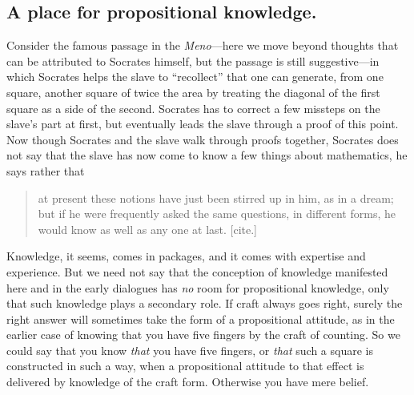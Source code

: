 \documentclass[11pt]{amsart}
\begin{document}
\subsection{A place for propositional knowledge.} Consider the famous passage in the \emph{Meno}---here we move beyond thoughts that can be attributed to Socrates himself, but the passage is still suggestive---in which Socrates helps the slave to ``recollect'' that one can generate, from one square, another square of twice the area by treating the diagonal of the first square as a side of the second. Socrates has to correct a few missteps on the slave's part at first, but eventually leads the slave through a proof of this point. Now though Socrates and the slave walk through proofs together, Socrates does not say that the slave has now come to know a few things about mathematics, he says rather that\begin{quote}at present these notions have just been stirred up in him, as in a dream; but if he were frequently asked the same questions, in different forms, he would know as well as any one at last. [cite.]\end{quote} Knowledge, it seems, comes in packages, and it comes with expertise and experience. But we need not say that the conception of knowledge manifested here and in the early dialogues has \emph{no} room for propositional knowledge, only that such knowledge plays a secondary role. If craft always goes right, surely the right answer will sometimes take the form of a propositional attitude, as in the earlier case of knowing that you have five fingers by the craft of counting. So we could say that you know \emph{that} you have five fingers, or \emph{that} such a square is constructed in such a way, when a propositional attitude to that effect is delivered by knowledge of the craft form. Otherwise you have mere belief.
\end{document}
